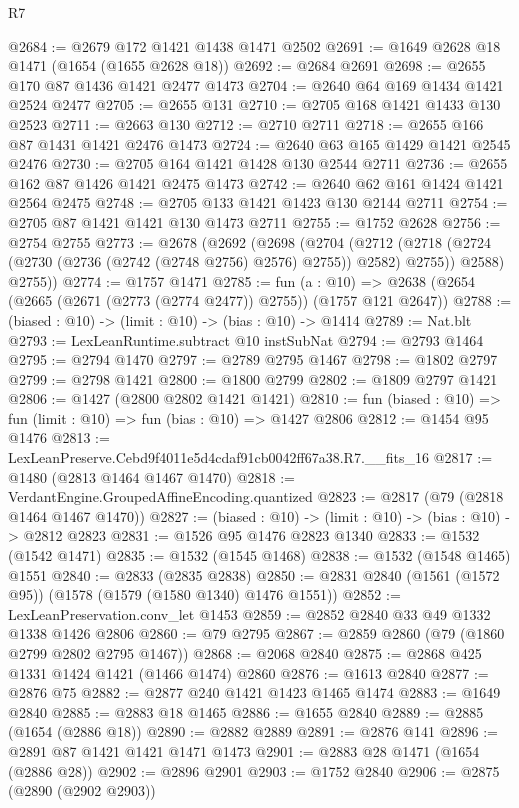 \begin{lexlean}{R7}
\begin{coremodule}
@2684 := @2679 @172 @1421 @1438 @1471 @2502
@2691 := @1649 @2628 @18 @1471 (@1654 (@1655 @2628 @18))
@2692 := @2684 @2691
@2698 := @2655 @170 @87 @1436 @1421 @2477 @1473
@2704 := @2640 @64 @169 @1434 @1421 @2524 @2477
@2705 := @2655 @131
@2710 := @2705 @168 @1421 @1433 @130 @2523
@2711 := @2663 @130
@2712 := @2710 @2711
@2718 := @2655 @166 @87 @1431 @1421 @2476 @1473
@2724 := @2640 @63 @165 @1429 @1421 @2545 @2476
@2730 := @2705 @164 @1421 @1428 @130 @2544 @2711
@2736 := @2655 @162 @87 @1426 @1421 @2475 @1473
@2742 := @2640 @62 @161 @1424 @1421 @2564 @2475
@2748 := @2705 @133 @1421 @1423 @130 @2144 @2711
@2754 := @2705 @87 @1421 @1421 @130 @1473 @2711
@2755 := @1752 @2628
@2756 := @2754 @2755
@2773 := @2678
    (@2692
      (@2698
        (@2704
          (@2712 (@2718 (@2724 (@2730 (@2736 (@2742 (@2748 @2756) @2576) @2755)) @2582) @2755))
          @2588)
        @2755))
@2774 := @1757 @1471
@2785 := fun (a : @10) =>
  @2638 (@2654 (@2665 (@2671 (@2773 (@2774 @2477)) @2755)) (@1757 @121 @2647))
@2788 := (biased : @10) -> (limit : @10) -> (bias : @10) -> @1414
@2789 := Nat.blt
@2793 := LexLeanRuntime.subtract @10 instSubNat
@2794 := @2793 @1464
@2795 := @2794 @1470
@2797 := @2789 @2795 @1467
@2798 := @1802 @2797
@2799 := @2798 @1421
@2800 := @1800 @2799
@2802 := @1809 @2797 @1421
@2806 := @1427 (@2800 @2802 @1421 @1421)
@2810 := fun (biased : @10) => fun (limit : @10) => fun (bias : @10) => @1427 @2806
@2812 := @1454 @95 @1476
@2813 := LexLeanPreserve.Cebd9f4011e5d4cdaf91cb0042ff67a38.R7.__fits_16
@2817 := @1480 (@2813 @1464 @1467 @1470)
@2818 := VerdantEngine.GroupedAffineEncoding.quantized
@2823 := @2817 (@79 (@2818 @1464 @1467 @1470))
@2827 := (biased : @10) -> (limit : @10) -> (bias : @10) -> @2812 @2823
@2831 := @1526 @95 @1476 @2823 @1340
@2833 := @1532 (@1542 @1471)
@2835 := @1532 (@1545 @1468)
@2838 := @1532 (@1548 @1465) @1551
@2840 := @2833 (@2835 @2838)
@2850 := @2831 @2840 (@1561 (@1572 @95)) (@1578 (@1579 (@1580 @1340) @1476 @1551))
@2852 := LexLeanPreservation.conv_let @1453
@2859 := @2852 @2840 @33 @49 @1332 @1338 @1426 @2806
@2860 := @79 @2795
@2867 := @2859 @2860 (@79 (@1860 @2799 @2802 @2795 @1467))
@2868 := @2068 @2840
@2875 := @2868 @425 @1331 @1424 @1421 (@1466 @1474) @2860
@2876 := @1613 @2840
@2877 := @2876 @75
@2882 := @2877 @240 @1421 @1423 @1465 @1474
@2883 := @1649 @2840
@2885 := @2883 @18 @1465
@2886 := @1655 @2840
@2889 := @2885 (@1654 (@2886 @18))
@2890 := @2882 @2889
@2891 := @2876 @141
@2896 := @2891 @87 @1421 @1421 @1471 @1473
@2901 := @2883 @28 @1471 (@1654 (@2886 @28))
@2902 := @2896 @2901
@2903 := @1752 @2840
@2906 := @2875 (@2890 (@2902 @2903))

\end{coremodule}
\end{lexlean}
